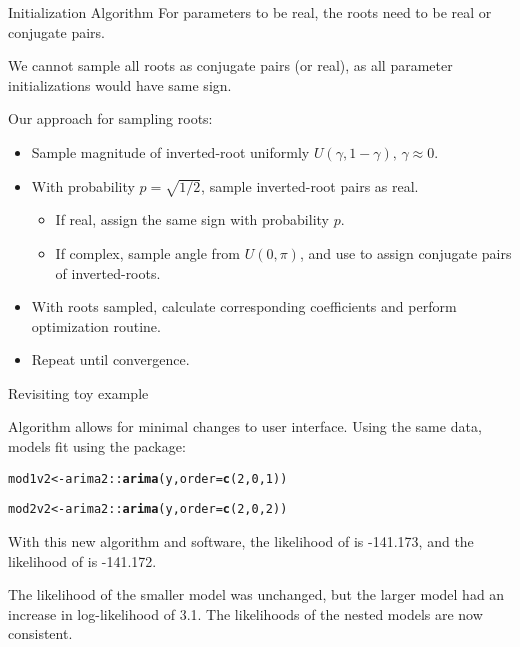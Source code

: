 \documentclass[aspectratio=169]{beamer}\usepackage[]{graphicx}\usepackage[]{xcolor}
\makeatletter
\newcommand{\hlnum}[1]{\textcolor[rgb]{0.686,0.059,0.569}{#1}}%
\newcommand{\hlopt}[1]{\textcolor[rgb]{0,0,0}{#1}}%
\newcommand{\hldef}[1]{\textcolor[rgb]{0.345,0.345,0.345}{#1}}%
\newcommand{\hlkwb}[1]{\textcolor[rgb]{0.69,0.353,0.396}{#1}}%
\newcommand{\hlkwc}[1]{\textcolor[rgb]{0.333,0.667,0.333}{#1}}%
\newcommand{\hlkwd}[1]{\textcolor[rgb]{0.737,0.353,0.396}{\textbf{#1}}}%
\newenvironment{kframe}{%
 \def\at@end@of@kframe{}%
 \ifinner\ifhmode%
  \def\at@end@of@kframe{\end{minipage}}%
  \begin{minipage}{\columnwidth}%
 \fi\fi%
 \def\FrameCommand##1{\hskip\@totalleftmargin \hskip-\fboxsep
 \colorbox{shadecolor}{##1}\hskip-\fboxsep
     \hskip-\linewidth \hskip-\@totalleftmargin \hskip\columnwidth}%
 \MakeFramed {\advance\hsize-\width
   \@totalleftmargin\z@ \linewidth\hsize
   \@setminipage}}%
 {\par\unskip\endMakeFramed%
 \at@end@of@kframe}
\newenvironment{knitrout}{}{} %
\makeatother
\begin{document}
\begin{frame}{Initialization Algorithm}
  For parameters to be real, the roots need to be real or conjugate pairs. 
  
  We cannot sample all roots as conjugate pairs (or real), as all parameter initializations would have same sign.
  
  Our approach for sampling roots:
  \begin{itemize}
    \item Sample magnitude of inverted-root uniformly $U(\gamma, 1-\gamma), \, \gamma \approx 0$.
    \item With probability $p = \sqrt{1/2}$, sample inverted-root pairs as real.
    \begin{itemize}
      \item If real, assign the same sign with probability $p$.
      \item If complex, sample angle from $U(0, \pi)$, and use to assign conjugate pairs of inverted-roots.
    \end{itemize}
    \item With roots sampled, calculate corresponding coefficients and perform optimization routine.
    \item Repeat until convergence.
  \end{itemize}
\end{frame}

\begin{frame}{Revisiting toy example}

Algorithm allows for minimal changes to user interface.
Using the same data, models fit using the  package:



\begin{knitrout}
\color{fgcolor}\begin{kframe}
\begin{alltt}
\hldef{mod1v2} \hlkwb{<-} \hldef{arima2}\hlopt{::}\hlkwd{arima}\hldef{(y,} \hlkwc{order} \hldef{=} \hlkwd{c}\hldef{(}\hlnum{2}\hldef{,} \hlnum{0}\hldef{,} \hlnum{1}\hldef{))}

\hldef{mod2v2} \hlkwb{<-} \hldef{arima2}\hlopt{::}\hlkwd{arima}\hldef{(y,} \hlkwc{order} \hldef{=} \hlkwd{c}\hldef{(}\hlnum{2}\hldef{,} \hlnum{0}\hldef{,} \hlnum{2}\hldef{))}
\end{alltt}
\end{kframe}
\end{knitrout}

With this new algorithm and software, the likelihood of  is -141.173, and the likelihood of  is -141.172.

\pause
The likelihood of the smaller model was unchanged, but the larger model had an increase in log-likelihood of 3.1. The likelihoods of the nested models are now \alert{consistent}.
\end{frame}
\end{document}
